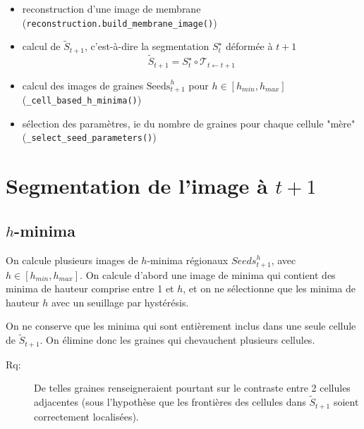 \documentclass{article}
\newenvironment{remarque}{\color{red}\begin{description}\item[Rq:]}
{\end{description}\color{black}}
\begin{document}
\color{black}













\pagebreak





\begin{itemize}

\item reconstruction d'une image de membrane 
(\verb|reconstruction.build_membrane_image()|)

\item calcul de $\tilde{S}_{t+1}$, c'est-\`a-dire la segmentation $S^{\star}_{t}$ d\'eform\'ee \`a $t+1$ 
\begin{displaymath}
\tilde{S}_{t+1} = S^{\star}_{t} \circ \mathcal{T}_{t \leftarrow t+1}
\end{displaymath}

\item calcul des images de graines $\mathrm{Seeds}^{h}_{t+1}$ pour $h \in [h_{min}, h_{max}]$ (\verb|_cell_based_h_minima()|)

\item s\'election des param\`etres, ie du nombre de graines pour chaque cellule "m\`ere" (\verb|_select_seed_parameters()|)

\end{itemize}





\section{Segmentation de l'image \`a $t+1$}

\subsection{$h$-minima}

On calcule plusieurs images de $h$-minima r\'egionaux $Seeds^{h}_{t+1}$, avec $h \in [h_{min}, h_{max}]$. On calcule d'abord une image de minima qui contient des minima de hauteur comprise entre 1 et $h$, et on ne s\'electionne que les minima de hauteur $h$ avec un seuillage par hyst\'er\'esis. 

On ne conserve que les minima qui sont enti\`erement inclus dans une seule cellule de $\tilde{S}_{t+1}$. On \'elimine donc les graines qui chevauchent plusieurs cellules. 
\begin{remarque}
De telles graines renseigneraient pourtant sur le contraste entre 2 cellules adjacentes (sous l'hypoth\`ese que les fronti\`eres des cellules dans $\tilde{S}_{t+1}$ soient correctement localis\'ees).
\end{remarque}
\end{document}
